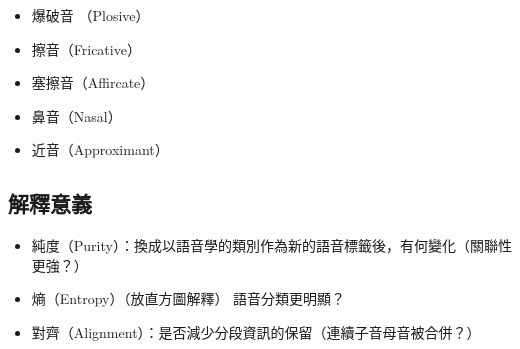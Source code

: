 \begin{itemize}
    \item 爆破音 （Plosive）
    \item 擦音（Fricative）
    \item 塞擦音（Affircate）
    \item 鼻音（Nasal）
    \item 近音（Approximant）
\end{itemize}

\subsection{解釋意義}

\begin{itemize}
    \item 純度（Purity）：換成以語音學的類別作為新的語音標籤後，有何變化（關聯性更強？）
    \item 熵（Entropy）（放直方圖解釋） \rightarrow 語音分類更明顯？
    \item 對齊（Alignment）：是否減少分段資訊的保留（連續子音母音被合併？）
\end{itemize}












